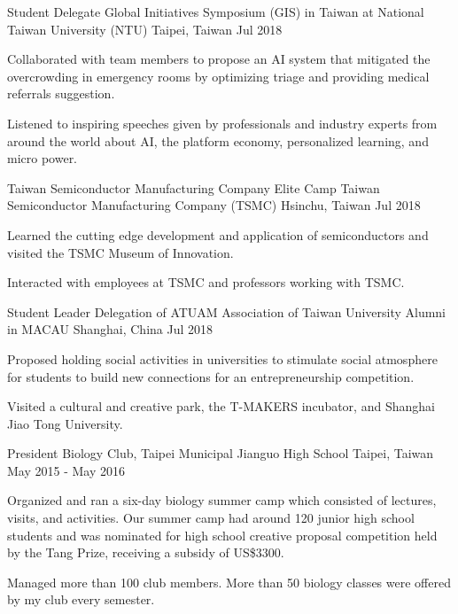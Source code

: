 \begin{cventries}
    \cventry
    {Student Delegate} %
    {Global Initiatives Symposium (GIS) in Taiwan at National Taiwan University (NTU)} %
    {Taipei, Taiwan} %
    {Jul 2018} %
    {
	\begin{cvitems} %
      	\item Collaborated with team members to propose an AI system that mitigated the overcrowding in emergency rooms by optimizing triage and providing medical referrals suggestion. 
      	\item Listened to inspiring speeches given by professionals and industry experts from around the world about AI, the platform economy, personalized learning, and micro power.
	\end{cvitems}
    }  
    
    \cventry
    {Taiwan Semiconductor Manufacturing Company Elite Camp} %
    {Taiwan Semiconductor Manufacturing Company (TSMC)} %
    {Hsinchu, Taiwan} %
    {Jul 2018} %
    {
	\begin{cvitems} %
      	\item Learned the cutting edge development and application of semiconductors and visited the TSMC Museum of Innovation. 
      	\item Interacted with employees at TSMC and professors working with TSMC.
	\end{cvitems}
    } 
    
     \cventry
    {Student Leader Delegation of ATUAM} %
    {Association of Taiwan University Alumni in MACAU} %
    {Shanghai, China} %
    {Jul 2018} %
    {
	\begin{cvitems} %
      	\item Proposed holding social activities in universities to stimulate social atmosphere for students to build new connections for an entrepreneurship competition. 
      	\item Visited a cultural and creative park, the T-MAKERS incubator, and Shanghai Jiao Tong University.
	\end{cvitems}
    } 
    
    \cventry
    {President} %
    {Biology Club, Taipei Municipal Jianguo High School} %
    {Taipei, Taiwan} %
    {May 2015 - May 2016} %
    {
	\begin{cvitems} %
      	\item Organized and ran a six-day biology summer camp which consisted of lectures, visits, and activities. Our summer camp had around 120 junior high school students and was nominated for high school creative proposal competition held by the Tang Prize, receiving a subsidy of US\$3300. 
      	\item Managed more than 100 club members. More than 50 biology classes were offered by my club every semester.
	\end{cvitems}
    } 
    
    

\end{cventries}
